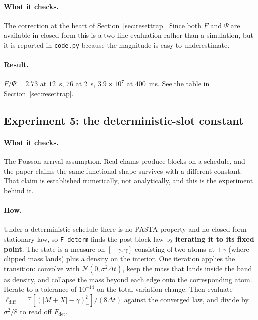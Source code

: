 \documentclass[11pt]{article}
\theoremstyle{definition}
\theoremstyle{remark}
\newcommand{\E}{\mathbb{E}}
\newcommand{\dt}{\Delta t}
\newcommand{\1}{\mathbf{1}}
\begin{document}
\paragraph{What it checks.} The correction at the heart of Section~\ref{sec:resettrap}. Since both $F$ and $\Psi$ are available in closed form this is a two-line evaluation rather than a simulation, but it is reported in \texttt{code.py} because the magnitude is easy to underestimate.

\paragraph{Result.} $F/\Psi = 2.73$ at $12$~s, $76$ at $2$~s, $3.9\times10^{7}$ at $400$~ms. See the table in Section~\ref{sec:resettrap}.

\subsection{Experiment 5: the deterministic-slot constant}\label{sec:schedule}

\paragraph{What it checks.} The Poisson-arrival assumption. Real chains produce blocks on a schedule, and the paper claims the same functional shape survives with a different constant. That claim is established numerically, not analytically, and this is the experiment behind it.

\paragraph{How.} Under a deterministic schedule there is no PASTA property and no closed-form stationary law, so \texttt{F\_determ} finds the post-block law by \textbf{iterating it to its fixed point}. The state is a measure on $[-\gamma,\gamma]$ consisting of two atoms at $\pm\gamma$ (where clipped mass lands) plus a density on the interior. One iteration applies the transition: convolve with $\mathcal N(0,\sigma^2\dt)$, keep the mass that lands inside the band as density, and collapse the mass beyond each edge onto the corresponding atom. Iterate to a tolerance of $10^{-14}$ on the total-variation change. Then evaluate $\ell_{\mathrm{diff}} = \E[(|M+X|-\gamma)_+^2]/(8\dt)$ against the converged law, and divide by $\sigma^2/8$ to read off $F_{\det}$.
\end{document}
